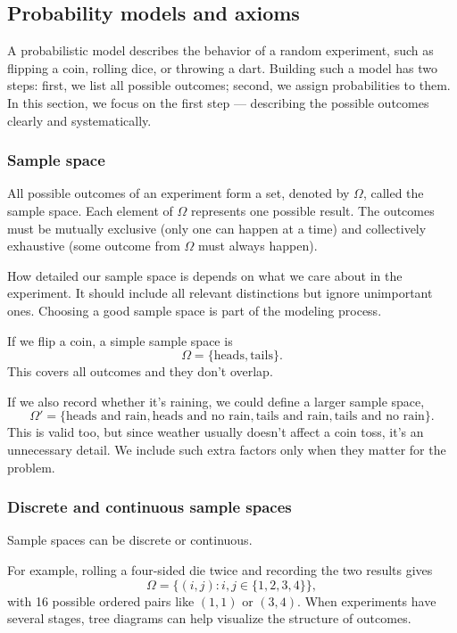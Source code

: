 \subsection{Probability models and axioms}

A probabilistic model describes the behavior of a random experiment, such as flipping a coin, rolling dice, or throwing a dart. Building such a model has two steps: first, we list all possible outcomes; second, we assign probabilities to them. In this section, we focus on the first step — describing the possible outcomes clearly and systematically.

\subsubsection{Sample space}

All possible outcomes of an experiment form a set, denoted by \(\Omega\), called the sample space. Each element of \(\Omega\) represents one possible result. The outcomes must be mutually exclusive (only one can happen at a time) and collectively exhaustive (some outcome from \(\Omega\) must always happen).

How detailed our sample space is depends on what we care about in the experiment. It should include all relevant distinctions but ignore unimportant ones. Choosing a good sample space is part of the modeling process.

\bigskip
If we flip a coin, a simple sample space is
\[
\Omega = \{\text{heads}, \text{tails}\}.
\]
This covers all outcomes and they don’t overlap.

If we also record whether it’s raining, we could define a larger sample space,
\[
\Omega' = \{\text{heads and rain}, \text{heads and no rain}, \text{tails and rain}, \text{tails and no rain}\}.
\]
This is valid too, but since weather usually doesn’t affect a coin toss, it’s an unnecessary detail. We include such extra factors only when they matter for the problem.

\subsubsection{Discrete and continuous sample spaces}

Sample spaces can be discrete or continuous.

For example, rolling a four-sided die twice and recording the two results gives
\[
\Omega = \{(i,j): i,j \in \{1,2,3,4\}\},
\]
with 16 possible ordered pairs like \((1,1)\) or \((3,4)\). When experiments have several stages, tree diagrams can help visualize the structure of outcomes.

